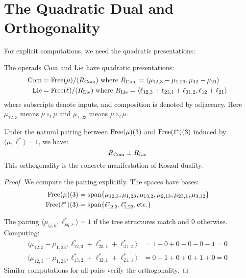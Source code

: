 \section{The Quadratic Dual and Orthogonality}
 
For explicit computations, we need the quadratic presentations:
 
\begin{proposition}
The operads $\operatorname{Com}$ and $\operatorname{Lie}$ have quadratic presentations:
\begin{align}
\operatorname{Com} &= \operatorname{Free}(\mu)/(R_{\operatorname{Com}}) \text{ where } R_{\operatorname{Com}} = \langle \mu_{12,3} - \mu_{1,23}, \mu_{12} - \mu_{21} \rangle \\
\operatorname{Lie} &= \operatorname{Free}(\ell)/(R_{\operatorname{Lie}}) \text{ where } R_{\operatorname{Lie}} = \langle \ell_{12,3} + \ell_{23,1} + \ell_{31,2}, \ell_{12} + \ell_{21} \rangle
\end{align}
where subscripts denote inputs, and composition is denoted by adjacency. Here $\mu_{12,3}$ means $\mu \circ_1 \mu$ and $\mu_{1,23}$ means $\mu \circ_2 \mu$.
\end{proposition}
 
\begin{proposition}[Orthogonality]\label{prop:orthogonal}
Under the natural pairing between $\operatorname{Free}(\mu)(3)$ and $\operatorname{Free}(\ell^*)(3)$ induced by $\langle \mu, \ell^* \rangle = 1$, we have:
\[
R_{\operatorname{Com}} \perp R_{\operatorname{Lie}}
\]
This orthogonality is the concrete manifestation of Koszul duality.
\end{proposition}
 
\begin{proof}
We compute the pairing explicitly. The spaces have bases:
\begin{align}
\operatorname{Free}(\mu)(3) &= \text{span}\{\mu_{12,3}, \mu_{1,23}, \mu_{13,2}, \mu_{2,13}, \mu_{23,1}, \mu_{3,12}\} \\
\operatorname{Free}(\ell^*)(3) &= \text{span}\{\ell^*_{12,3}, \ell^*_{1,23}, \text{etc.}\}
\end{align}
 
The pairing $\langle \mu_{ij,k}, \ell^*_{pq,r} \rangle = 1$ if the tree structures match and $0$ otherwise. Computing:
\begin{align}
\langle \mu_{12,3} - \mu_{1,23}, \ell^*_{12,3} + \ell^*_{23,1} + \ell^*_{31,2} \rangle &= 1 + 0 + 0 - 0 - 0 - 1 = 0 \\
\langle \mu_{12,3} - \mu_{1,23}, \ell^*_{13,2} + \ell^*_{32,1} + \ell^*_{21,3} \rangle &= 0 - 1 + 0 + 0 + 1 + 0 = 0
\end{align}
Similar computations for all pairs verify the orthogonality.
\end{proof}

